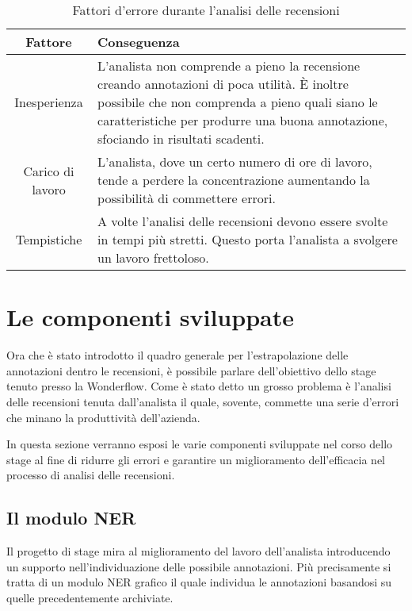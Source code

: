 \begin{table}[ht]
\begin{center}
\begin{tabular}{|c|p{10cm}|}
\hline
\textbf{Fattore} & \textbf{Conseguenza} \\ \hline
Inesperienza &
L'analista non comprende a pieno la recensione creando annotazioni di poca
utilità. È inoltre possibile che non comprenda a pieno quali siano le
caratteristiche per produrre una buona annotazione, sfociando in risultati
scadenti. \\ \hline
Carico di lavoro &
L'analista, dove un certo numero di ore di lavoro, tende a perdere la
concentrazione aumentando la possibilità di commettere errori. \\ \hline
Tempistiche &
A volte l'analisi delle recensioni devono essere svolte in tempi più stretti.
Questo porta l'analista a svolgere un lavoro frettoloso.
\\ \hline
\end{tabular}
\end{center}
\caption{Fattori d'errore durante l'analisi delle recensioni}
\label{tab:fattori_errore}
\end{table}

\section{Le componenti sviluppate}
Ora che è stato introdotto il quadro generale per l'estrapolazione delle
annotazioni dentro le recensioni, è possibile parlare dell'obiettivo dello stage
tenuto presso la Wonderflow. Come è stato detto un grosso problema è l'analisi
delle recensioni tenuta dall'analista il quale, sovente, commette una serie
d'errori che minano la produttività dell'azienda.

In questa sezione verranno esposi le varie componenti sviluppate nel corso dello
stage al fine di ridurre gli errori e garantire un miglioramento dell'efficacia
nel processo di analisi delle recensioni.

\subsection{Il modulo NER}
Il progetto di stage mira al miglioramento del lavoro dell'analista introducendo
un supporto nell'individuazione delle possibile annotazioni. Più precisamente
si tratta di un modulo \gls{NER} grafico il quale individua le annotazioni 
basandosi su quelle precedentemente archiviate.

